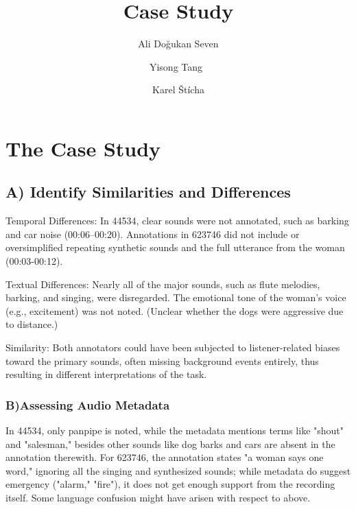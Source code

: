 \documentclass[runningheads]{llncs}
\begin{document}
%
\title{Case Study}
%
%
\author{Ali Doğukan Seven \and
Yisong Tang\ \and
Karel Štícha 
}
%
%
%
\maketitle              %
%
%
%
%
\section{The Case Study}
\subsection{ A) Identify Similarities and Differences}

Temporal Differences: In 44534, clear sounds were not annotated, such as barking and car noise (00:06–00:20). Annotations in 623746 did not include or oversimplified repeating synthetic sounds and the full utterance from the woman (00:03-00:12). 

Textual Differences: Nearly all of the major sounds, such as flute melodies, barking, and singing, were disregarded. The emotional tone of the woman's voice (e.g., excitement) was not noted. (Unclear whether the dogs were aggressive due to distance.) 

Similarity: Both annotators could have been subjected to listener-related biases toward the primary sounds, often missing background events entirely, thus resulting in different interpretations of the task.
\subsubsection{B)Assessing Audio Metadata} In 44534, only panpipe is noted, while the metadata mentions terms like "shout" and "salesman," besides other sounds like dog barks and cars are absent in the annotation therewith. For 623746, the annotation states "a woman says one word," ignoring all the singing and synthesized sounds; while metadata do suggest emergency ("alarm," "fire"), it does not get enough support from the recording itself. Some language confusion might have arisen with respect to above.
\end{document}
